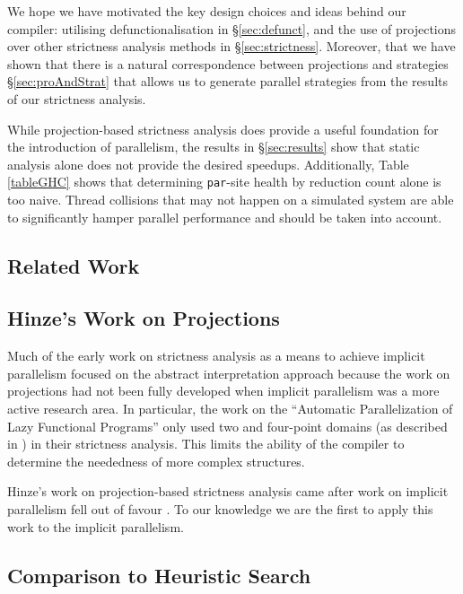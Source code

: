 
We hope we have motivated the key design choices and ideas behind our compiler:
utilising defunctionalisation in \S\ref{sec:defunct}, and the use of
projections over other strictness analysis methods in \S\ref{sec:strictness}.
Moreover, that we have shown that there is a natural correspondence between
projections and strategies \S\ref{sec:proAndStrat} that allows us to generate
parallel strategies from the results of our strictness analysis.

While projection-based strictness analysis does provide a useful foundation for
the introduction of parallelism, the results in \S\ref{sec:results} show that
static analysis alone does not provide the desired speedups. Additionally,
Table \ref{tableGHC} shows that determining \verb-par--site health by reduction
count alone is too naive. Thread collisions that may not happen on a simulated
system are able to significantly hamper parallel performance and should be
taken into account.

\subsection{Related Work}

\subsection*{Hinze's Work on Projections} 

Much of the early work on strictness
analysis as a means to achieve implicit parallelism focused on the abstract
interpretation approach because the work on projections had not been fully
developed when implicit parallelism was a more active research area. In
particular, the work on the ``Automatic Parallelization of Lazy Functional
Programs'' \citep{hogen1992automatic} only used two and four-point domains (as
described in \citep{wadler1987strictness}) in their strictness analysis. This
limits the ability of the compiler to determine the neededness of more complex
structures.

Hinze's work on projection-based strictness analysis came after work on implicit
parallelism fell out of favour \citep{hinze1995projection, hammond2000research}. To
our knowledge we are the first to apply this work to the implicit parallelism.

\subsection{Comparison to Heuristic Search}

